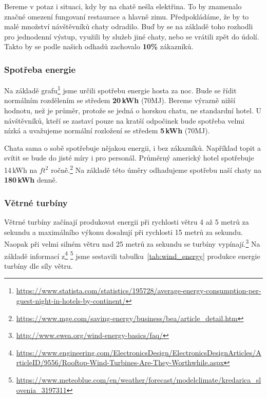 Bereme v potaz i situaci, kdy by na chatě nešla elektřina. To by znamenalo značné omezení fungovaní restaurace a hlavně zimu. Předpokládáme, že by to malé množství návštěvníků chaty odradilo. Buď by se na základě toho rozhodli pro jednodenní výstup, využili by služeb jiné chaty, nebo se vrátili zpět do údolí. Takto by se podle našich odhadů zachovalo \textbf{10\%} zákazníků.



\subsubsection{Spotřeba energie}

Na základě grafu\footnote{\url{https://www.statista.com/statistics/195728/average-energy-consumption-per-guest-night-in-hotels-by-continent/}} jsme určili spotřebu energie hosta za noc. Bude se řídit normálním rozdělením se středem \textbf{20\,kWh} (70MJ). Bereme výrazně nižší hodnotu, než je průměr, protože se jedná o horskou chatu, ne standardní hotel. U návštěvníků, kteří se zastaví pouze na kratší odpočinek bude spotřeba velmi nízká a uvažujeme normální rozložení se středem \textbf{5\,kWh} (70MJ).

Chata sama o sobě spotřebuje nějakou energii, i bez zákazníků. Například topit a svítit se bude do jisté míry i pro personál. Průměrný americký hotel spotřebuje 14\,kWh na $ft^2$ ročně.\footnote{\url{https://www.mge.com/saving-energy/business/bea/article_detail.htm}} Na základě této úměry odhadujeme spotřebu naší chaty na \textbf{180\,kWh} denně.



\subsubsection{Větrné turbíny}

Větrné turbíny začínají produkovat energii při rychlosti větru 4 až 5 metrů za sekundu a maximálního výkonu dosahují při rychlosti 15 metrů za sekundu. Naopak při velmi silném větru nad 25 metrů za sekundu se turbíny vypínají.\footnote{\url{http://www.ewea.org/wind-energy-basics/faq/}} Na základě informací z\footnote{\url{https://www.engineering.com/ElectronicsDesign/ElectronicsDesignArticles/ArticleID/9556/Rooftop-Wind-Turbines-Are-They-Worthwhile.aspx}} \footnote{\url{https://www.meteoblue.com/en/weather/forecast/modelclimate/kredarica_slovenia_3197311}} jsme sestavili tabulku~\ref{tab:wind_energy} produkce energie turbíny dle síly větru.

